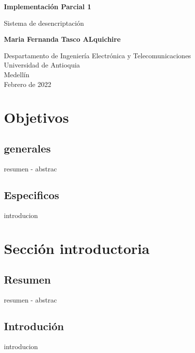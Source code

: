 \documentclass{article}
\begin{document}
\begin{titlepage}
    \begin{center}
        \vspace*{1cm}
            
        \Huge
        \textbf{Implementación Parcial 1}
            
        \vspace{0.5cm}
        \LARGE
        Sistema de desencriptación 
            
        \vspace{5cm}
            
        \textbf{Maria Fernanda Tasco ALquichire}
            
        \vfill
            
        \vspace{0.8cm}
            
        \Large
        Despartamento de Ingeniería Electrónica y Telecomunicaciones\\
        Universidad de Antioquia\\
        Medellín\\
        Febrero de 2022
            
    \end{center}
\end{titlepage}

\tableofcontents
\newpage

\section{Objetivos}\label{intro1}
\subsection{generales}
resumen - abstrac
\subsection{Especificos}
introducion

\section{Sección introductoria}\label{intro2}
\subsection{Resumen}
resumen - abstrac
\subsection{Introdución}
introducion
\end{document}
